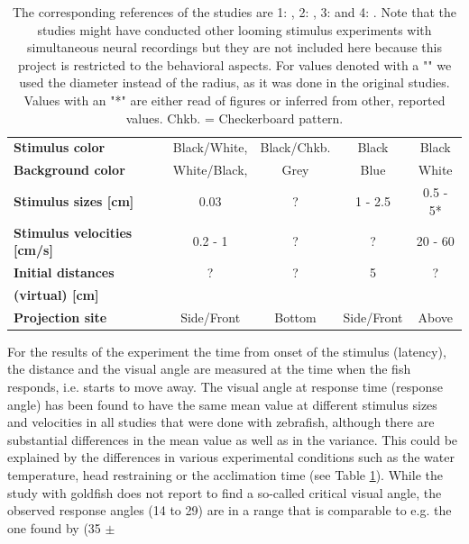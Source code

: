 \documentclass[a4paper,10pt,hidelinks]{scrreprt}
\begin{document}
\begin{table} [!th]
\begin{center}
\begin{tabular}{l|c|c|c|c}
				\textbf{Stimulus color} & Black/White, & Black/Chkb. & Black & Black\\
				\textbf{Background color} & White/Black, & Grey & Blue & White\\
				\textbf{Stimulus sizes [cm]} & 0.03 & ? & 1 - 2.5 & 0.5 - 5*\\
				\textbf{Stimulus velocities [cm/s]} & 0.2 - 1 & ? & ? & 20 - 60\\
				\textbf{Initial distances} & ? & ? & 5 & ?\\
				\textbf{(virtual) [cm]} &  &  &  & \\
				\textbf{Projection site} & Side/Front & Bottom & Side/Front & Above\\
			\end{tabular}
		\end{center}
		\caption{The corresponding references of the studies are 1: \cite{Temizer2015}, 
		2: \cite{Dunn2016}, 3: \cite{Bhattacharyya2017} and 4: \cite{Preuss2006}.
		Note that the studies might have conducted other looming stimulus experiments with 
		simultaneous neural recordings but they are not included here because this project is 
		restricted to the behavioral aspects.
		For values denoted with a "\dag" we used the diameter 
		instead of the radius, as it was done in the original studies.
		Values with an "*" are either 
		read of figures or inferred from other, reported values. Chkb. = Checkerboard pattern.}
		\label{tab:looming_exp}
	\end{table}
	For the results of the experiment the time from onset of the stimulus (latency), the distance and the 
	visual angle are measured at the time when the fish responds, i.e. starts to move away.
	The visual angle at response time (response angle) has been found to have the same mean value 
	at different stimulus sizes and velocities in all studies that were done with zebrafish, 
	although there are substantial differences in the mean value as well as in the variance.
	This could be explained by the differences in various experimental conditions such as the water 
	temperature, head restraining or the acclimation time (see Table \ref{tab:looming_exp}).
	While the study with goldfish \citep{Preuss2006} does not report to find a so-called critical visual angle, the observed response angles (14\textdegree{} to 29\textdegree) are in a range 
  	that is comparable to e.g. the one found by \cite{Bhattacharyya2017} (35\textdegree{} $\pm$ 
\end{document}
